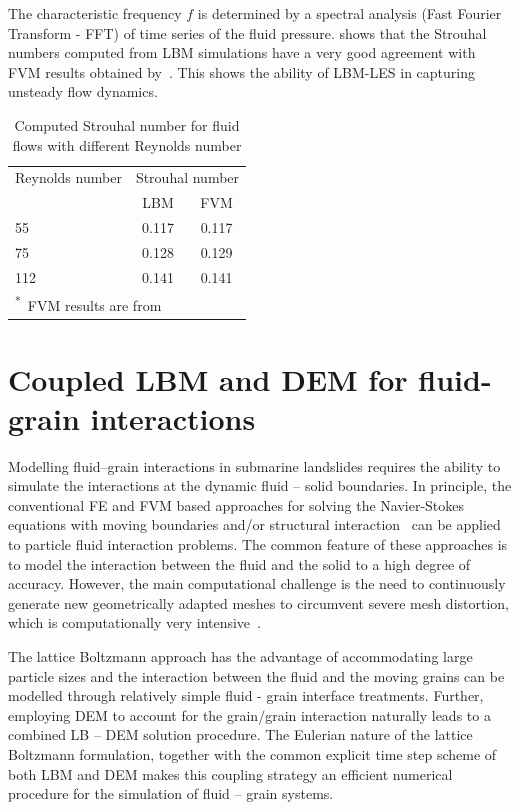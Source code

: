 \noindent The characteristic frequency $f$ is determined by a spectral 
analysis (Fast Fourier Transform - FFT) of time series of the fluid pressure. 
 shows that the Strouhal numbers computed from LBM 
simulations have a very good agreement with FVM results obtained 
by~\citet{Breuer2000}. This shows the ability of LBM-LES in capturing unsteady 
flow dynamics.


\begin{table}[tbhp]
	\caption{Computed Strouhal number for fluid flows with different Reynolds 
	number}
	\label{table:strouhal}
	\centering
	\begin{tabular}{l c c}
		\toprule
		Reynolds number & \multicolumn{2}{c}{Strouhal number} \\
		\cmidrule{2-3}
		& LBM & FVM \\
		\midrule
		55		& 0.117	 &	0.117 \\
		75		& 0.128	 &	0.129 \\
		112		& 0.141  &	0.141 \\
		\bottomrule
		\multicolumn{3}{l}{\footnotesize{\textsuperscript{*}~FVM results are 
		from~\citet{Breuer2000}}}
	\end{tabular}
\end{table}




\section{Coupled LBM and DEM for fluid-grain interactions}
\label{sec:coupled_lbm_dem}
Modelling fluid--grain interactions in submarine landslides requires the 
ability to simulate the interactions at the dynamic fluid -- solid boundaries. 
In principle, the conventional FE and FVM based approaches for solving the 
Navier-Stokes equations with moving boundaries and/or structural 
interaction~\citep{Bathe2004} can be applied to particle fluid interaction 
problems. The common feature of these approaches is to model the interaction 
between the fluid and the solid to a high degree of accuracy. However, the main 
computational challenge is the need to continuously generate new geometrically 
adapted meshes to circumvent severe mesh distortion, which is computationally 
very intensive~\citep{Han2007a}. 

The lattice Boltzmann approach has the advantage of accommodating large 
particle sizes and the interaction between the fluid and the moving grains 
can be modelled through relatively simple fluid - grain interface treatments. 
Further, employing DEM to account for the grain/grain interaction naturally 
leads to a combined LB -- DEM solution procedure. The Eulerian nature 
of the lattice Boltzmann formulation, together with the common explicit time 
step scheme of both LBM and DEM makes this coupling strategy an efficient 
numerical procedure for the simulation of fluid -- grain systems. 


